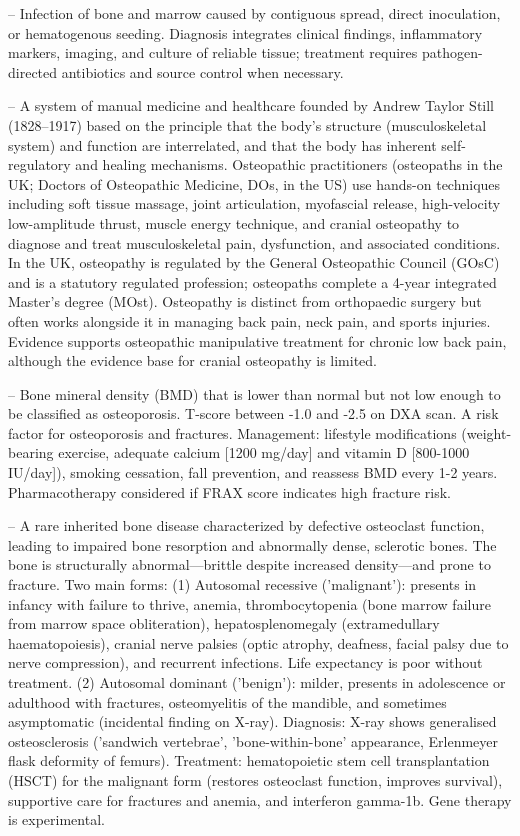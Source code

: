 -- Infection of bone and marrow caused by contiguous spread, direct inoculation, or hematogenous seeding. Diagnosis integrates clinical findings, inflammatory markers, imaging, and culture of reliable tissue; treatment requires pathogen-directed antibiotics and source control when necessary.

-- A system of manual medicine and healthcare founded by Andrew Taylor Still (1828--1917) based on the principle that the body's structure (musculoskeletal system) and function are interrelated, and that the body has inherent self-regulatory and healing mechanisms. Osteopathic practitioners (osteopaths in the UK; Doctors of Osteopathic Medicine, DOs, in the US) use hands-on techniques including soft tissue massage, joint articulation, myofascial release, high-velocity low-amplitude thrust, muscle energy technique, and cranial osteopathy to diagnose and treat musculoskeletal pain, dysfunction, and associated conditions. In the UK, osteopathy is regulated by the General Osteopathic Council (GOsC) and is a statutory regulated profession; osteopaths complete a 4-year integrated Master's degree (MOst). Osteopathy is distinct from orthopaedic surgery but often works alongside it in managing back pain, neck pain, and sports injuries. Evidence supports osteopathic manipulative treatment for chronic low back pain, although the evidence base for cranial osteopathy is limited.

-- Bone mineral density (BMD) that is lower than normal but not low enough to be classified as osteoporosis. T-score between -1.0 and -2.5 on DXA scan. A risk factor for osteoporosis and fractures. Management: lifestyle modifications (weight-bearing exercise, adequate calcium [1200 mg/day] and vitamin D [800-1000 IU/day]), smoking cessation, fall prevention, and reassess BMD every 1-2 years. Pharmacotherapy considered if FRAX score indicates high fracture risk.

-- A rare inherited bone disease characterized by defective osteoclast function, leading to impaired bone resorption and abnormally dense, sclerotic bones. The bone is structurally abnormal—brittle despite increased density—and prone to fracture. Two main forms: (1) Autosomal recessive ('malignant'): presents in infancy with failure to thrive, anemia, thrombocytopenia (bone marrow failure from marrow space obliteration), hepatosplenomegaly (extramedullary haematopoiesis), cranial nerve palsies (optic atrophy, deafness, facial palsy due to nerve compression), and recurrent infections. Life expectancy is poor without treatment. (2) Autosomal dominant ('benign'): milder, presents in adolescence or adulthood with fractures, osteomyelitis of the mandible, and sometimes asymptomatic (incidental finding on X-ray). Diagnosis: X-ray shows generalised osteosclerosis ('sandwich vertebrae', 'bone-within-bone' appearance, Erlenmeyer flask deformity of femurs). Treatment: hematopoietic stem cell transplantation (HSCT) for the malignant form (restores osteoclast function, improves survival), supportive care for fractures and anemia, and interferon gamma-1b. Gene therapy is experimental.

